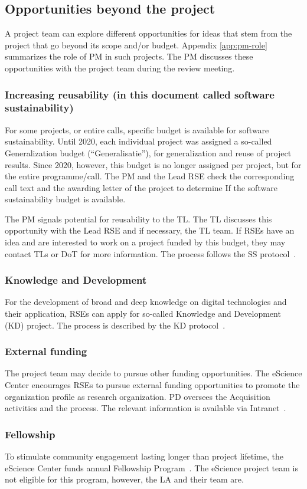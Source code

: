 \subsection{Opportunities beyond the project}
\label{sec:opportunities}
A project team can explore different opportunities for ideas that stem from the project that go beyond its scope and/or
budget. Appendix \ref{app:pm-role} summarizes the role of PM in such projects. The PM discusses these opportunities with the project
team during the review meeting.


\subsubsection{Increasing reusability (in this document called software sustainability)}
\label{sec:opportunities:ss}
For some projects, or entire calls, specific budget is available for software sustainability. Until 2020, each
individual project was assigned a so-called Generalization budget (“Generalisatie”), for generalization and reuse of
project results. Since 2020, however, this budget is no longer assigned per project, but for the entire programme/call.
The PM and the Lead RSE check the corresponding call text and the awarding letter of the project to determine If the
software sustainability budget is available.

The PM signals potential for reusability to the TL. The TL discusses this opportunity with the Lead RSE and if
necessary, the TL team. If RSEs have an idea and are interested to work on a project funded by this budget, they may
contact TLs or DoT for more information. The process follows the SS protocol~\cite{ss-intranet}.

\subsubsection{Knowledge and Development}
\label{sec:opportunities:kd}
For the development of broad and deep knowledge on digital technologies and their application, RSEs can apply for
so-called Knowledge and Development (KD) project. The process is described by the KD protocol~\cite{kd-intranet}.

\subsubsection{External funding}
\label{sec:opportunities:external-funding}
The project team may decide to pursue other funding opportunities. The eScience Center encourages RSEs to pursue
external funding opportunities to promote the organization profile as research organization. PD oversees the
Acquisition activities and the process. The relevant information is available via Intranet~\cite{external-intranet}.


\subsubsection{Fellowship}
\label{sec:opportunities:fellowship}
To stimulate community engagement lasting longer than project lifetime, the eScience Center funds annual Fellowship
Program~\cite{fellowship-intranet}. The eScience project team is not eligible for this program, however, the LA and their team are.
